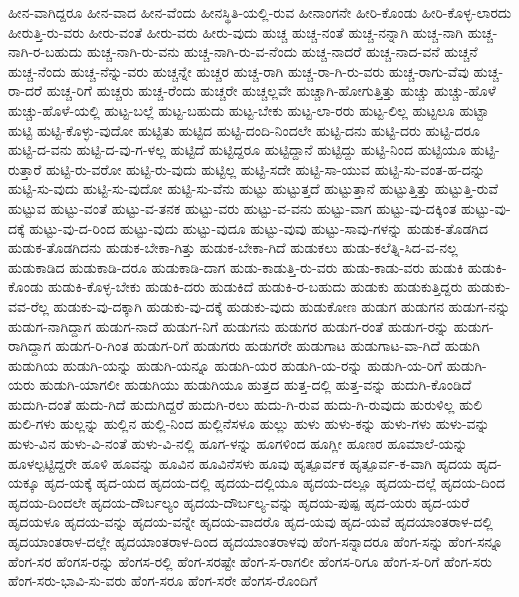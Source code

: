 {ಹೀನ-ವಾಗಿದ್ದರೂ
ಹೀನ-ವಾದ
ಹೀನ-ವೆಂದು
ಹೀನಸ್ಥಿತಿ-ಯಲ್ಲಿ-ರುವ
ಹೀನಾಂಗನೇ
ಹೀರಿ-ಕೊಂಡು
ಹೀರಿ-ಕೊಳ್ಳ-ಲಾರದು
ಹೀರುತ್ತಿ-ರು-ವರು
ಹೀರು-ವಂತೆ
ಹೀರು-ವರು
ಹೀರು-ವುದು
ಹುಚ್ಚ
ಹುಚ್ಚ-ನಂತೆ
ಹುಚ್ಚ-ನನ್ನಾಗಿ
ಹುಚ್ಚ-ನಾಗಿ
ಹುಚ್ಚ-ನಾಗಿ-ರ-ಬಹುದು
ಹುಚ್ಚ-ನಾಗಿ-ರು-ವನು
ಹುಚ್ಚ-ನಾಗಿ-ರು-ವ-ನೆಂದು
ಹುಚ್ಚ-ನಾದರೆ
ಹುಚ್ಚ-ನಾದ-ವನೆ
ಹುಚ್ಚನೆ
ಹುಚ್ಚ-ನೆಂದು
ಹುಚ್ಚ-ನೆನ್ನು-ವರು
ಹುಚ್ಚನ್ನೇ
ಹುಚ್ಚರ
ಹುಚ್ಚ-ರಾಗಿ
ಹುಚ್ಚ-ರಾ-ಗಿ-ರು-ವರು
ಹುಚ್ಚ-ರಾಗು-ವೆವು
ಹುಚ್ಚ-ರಾ-ದರೆ
ಹುಚ್ಚ-ರಿಗೆ
ಹುಚ್ಚರು
ಹುಚ್ಚ-ರೆಂದು
ಹುಚ್ಚರೇ
ಹುಚ್ಚಲ್ಲವೇ
ಹುಚ್ಚಾಗಿ-ಹೋಗುತ್ತಿತ್ತು
ಹುಚ್ಚು
ಹುಚ್ಚು-ಹೊಳೆ
ಹುಚ್ಚು-ಹೊಳೆ-ಯಲ್ಲಿ
ಹುಟ್ಟ-ಬಲ್ಲೆ
ಹುಟ್ಟ-ಬಹುದು
ಹುಟ್ಟ-ಬೇಕು
ಹುಟ್ಟ-ಲಾ-ರರು
ಹುಟ್ಟ-ಲಿಲ್ಲ
ಹುಟ್ಟಲೂ
ಹುಟ್ಟಾ
ಹುಟ್ಟಿ
ಹುಟ್ಟಿ-ಕೊಳ್ಳು-ವುದೋ
ಹುಟ್ಟಿತು
ಹುಟ್ಟಿದ
ಹುಟ್ಟಿ-ದಂದಿ-ನಿಂದಲೇ
ಹುಟ್ಟಿ-ದನು
ಹುಟ್ಟಿ-ದರು
ಹುಟ್ಟಿ-ದರೂ
ಹುಟ್ಟಿ-ದ-ವನು
ಹುಟ್ಟಿ-ದ-ವು-ಗ-ಳಲ್ಲ
ಹುಟ್ಟಿದೆ
ಹುಟ್ಟಿದ್ದರೂ
ಹುಟ್ಟಿದ್ದಾನೆ
ಹುಟ್ಟಿದ್ದು
ಹುಟ್ಟಿ-ನಿಂದ
ಹುಟ್ಟಿಯೂ
ಹುಟ್ಟಿ-ರುತ್ತಾರೆ
ಹುಟ್ಟಿ-ರು-ವರೋ
ಹುಟ್ಟಿ-ರು-ವುದು
ಹುಟ್ಟಿಲ್ಲ
ಹುಟ್ಟಿ-ಸದೇ
ಹುಟ್ಟಿ-ಸಾ-ಯುವ
ಹುಟ್ಟಿ-ಸು-ವಂತ-ಹ-ದನ್ನು
ಹುಟ್ಟಿ-ಸು-ವುದು
ಹುಟ್ಟಿ-ಸು-ವುದೋ
ಹುಟ್ಟಿ-ಸು-ವೆನು
ಹುಟ್ಟು
ಹುಟ್ಟುತ್ತದೆ
ಹುಟ್ಟುತ್ತಾನೆ
ಹುಟ್ಟುತ್ತಿತ್ತು
ಹುಟ್ಟುತ್ತಿ-ರುವೆ
ಹುಟ್ಟುವ
ಹುಟ್ಟು-ವಂತೆ
ಹುಟ್ಟು-ವ-ತನಕ
ಹುಟ್ಟು-ವರು
ಹುಟ್ಟು-ವ-ವನು
ಹುಟ್ಟು-ವಾಗ
ಹುಟ್ಟು-ವು-ದಕ್ಕಿಂತ
ಹುಟ್ಟು-ವು-ದಕ್ಕೆ
ಹುಟ್ಟು-ವು-ದ-ರಿಂದ
ಹುಟ್ಟು-ವುದು
ಹುಟ್ಟು-ವುದೂ
ಹುಟ್ಟು-ವುವು
ಹುಟ್ಟು-ಸಾವು-ಗಳನ್ನು
ಹುಡುಕ-ತೊಡಗಿದ
ಹುಡುಕ-ತೊಡಗಿದನು
ಹುಡುಕ-ಬೇಕಾ-ಗಿತ್ತು
ಹುಡುಕ-ಬೇಕಾ-ಗಿದೆ
ಹುಡುಕಲು
ಹುಡು-ಕಲೆತ್ನಿ-ಸಿದ-ವ-ನಲ್ಲ
ಹುಡುಕಾಡಿದ
ಹುಡುಕಾಡಿ-ದರೂ
ಹುಡುಕಾಡಿ-ದಾಗ
ಹುಡು-ಕಾಡುತ್ತಿ-ರು-ವರು
ಹುಡು-ಕಾಡು-ವರು
ಹುಡುಕಿ
ಹುಡುಕಿ-ಕೊಂಡು
ಹುಡುಕಿ-ಕೊಳ್ಳ-ಬೇಕು
ಹುಡುಕಿ-ದರು
ಹುಡುಕಿದೆ
ಹುಡುಕಿ-ರ-ಬಹುದು
ಹುಡುಕು
ಹುಡುಕುತ್ತಿದ್ದರು
ಹುಡುಕು-ವವ-ರೆಲ್ಲ
ಹುಡುಕು-ವು-ದಕ್ಕಾಗಿ
ಹುಡುಕು-ವು-ದಕ್ಕೆ
ಹುಡುಕು-ವುದು
ಹುಡುಕೋಣ
ಹುಡುಗ
ಹುಡುಗನ
ಹುಡುಗ-ನನ್ನು
ಹುಡುಗ-ನಾಗಿದ್ದಾಗ
ಹುಡುಗ-ನಾದೆ
ಹುಡುಗ-ನಿಗೆ
ಹುಡುಗನು
ಹುಡುಗರ
ಹುಡುಗ-ರಂತೆ
ಹುಡುಗ-ರನ್ನು
ಹುಡುಗ-ರಾಗಿದ್ದಾಗ
ಹುಡುಗ-ರಿ-ಗಿಂತ
ಹುಡುಗ-ರಿಗೆ
ಹುಡುಗರು
ಹುಡುಗರೇ
ಹುಡುಗಾಟ
ಹುಡುಗಾಟ-ವಾ-ಗಿದೆ
ಹುಡುಗಿ
ಹುಡುಗಿಯ
ಹುಡುಗಿ-ಯನ್ನು
ಹುಡುಗಿ-ಯನ್ನೂ
ಹುಡುಗಿ-ಯರ
ಹುಡುಗಿ-ಯ-ರನ್ನು
ಹುಡುಗಿ-ಯ-ರಿಗೆ
ಹುಡುಗಿ-ಯರು
ಹುಡುಗಿ-ಯಾಗಲೀ
ಹುಡುಗಿಯು
ಹುಡುಗಿಯೂ
ಹುತ್ತದ
ಹುತ್ತ-ದಲ್ಲಿ
ಹುತ್ತ-ವನ್ನು
ಹುದುಗಿ-ಕೊಂಡಿದೆ
ಹುದುಗಿ-ದಂತೆ
ಹುದು-ಗಿದೆ
ಹುದುಗಿದ್ದರೆ
ಹುದುಗಿ-ರಲು
ಹುದು-ಗಿ-ರುವ
ಹುದು-ಗಿ-ರುವುದು
ಹುರುಳಿಲ್ಲ
ಹುಲಿ
ಹುಲಿ-ಗಳು
ಹುಲ್ಲನ್ನು
ಹುಲ್ಲಿನ
ಹುಲ್ಲಿ-ನಿಂದ
ಹುಲ್ಲಿನೆಸಳೂ
ಹುಲ್ಲು
ಹುಳು
ಹುಳು-ಕನ್ನು
ಹುಳು-ಗಳು
ಹುಳು-ವನ್ನು
ಹುಳು-ವಿನ
ಹುಳು-ವಿ-ನಂತೆ
ಹುಳು-ವಿ-ನಲ್ಲಿ
ಹೂಗ-ಳನ್ನು
ಹೂಗಳಿಂದ
ಹೂಗ್ಲೀ
ಹೂಣರ
ಹೂಮಾಲೆ-ಯನ್ನು
ಹೂಳಲ್ಪಟ್ಟಿದ್ದರೇ
ಹೂಳಿ
ಹೂವನ್ನು
ಹೂವಿನ
ಹೂವಿನೆಸಳು
ಹೂವು
ಹೃತ್ಪೂರ್ವಕ
ಹೃತ್ಪೂರ್ವ-ಕ-ವಾಗಿ
ಹೃದಯ
ಹೃದ-ಯಕ್ಕೂ
ಹೃದ-ಯಕ್ಕೆ
ಹೃದ-ಯದ
ಹೃದಯ-ದಲ್ಲಿ
ಹೃದಯ-ದಲ್ಲಿಯೂ
ಹೃದಯ-ದಲ್ಲೂ
ಹೃದಯ-ದಲ್ಲೆ
ಹೃದಯ-ದಿಂದ
ಹೃದಯ-ದಿಂದಲೇ
ಹೃದಯ-ದೌರ್ಬಲ್ಯಂ
ಹೃದಯ-ದೌರ್ಬಲ್ಯ-ವನ್ನು
ಹೃದಯ-ಪುಷ್ಪ
ಹೃದ-ಯರು
ಹೃದ-ಯರೆ
ಹೃದಯಳೂ
ಹೃದಯ-ವನ್ನು
ಹೃದಯ-ವನ್ನೇ
ಹೃದಯ-ವಾದರೊ
ಹೃದ-ಯವು
ಹೃದ-ಯವೆ
ಹೃದಯಾಂತರಾಳ-ದಲ್ಲಿ
ಹೃದಯಾಂತರಾಳ-ದಲ್ಲೇ
ಹೃದಯಾಂತರಾಳ-ದಿಂದ
ಹೃದಯಾಂತರಾಳವು
ಹೆಂಗ-ಸನ್ನಾದರೂ
ಹೆಂಗ-ಸನ್ನು
ಹೆಂಗ-ಸನ್ನೂ
ಹೆಂಗ-ಸರ
ಹೆಂಗಸ-ರನ್ನು
ಹೆಂಗಸ-ರಲ್ಲಿ
ಹೆಂಗ-ಸರಷ್ಟೇ
ಹೆಂಗ-ಸ-ರಾಗಲೀ
ಹೆಂಗಸ-ರಿಗೂ
ಹೆಂಗ-ಸ-ರಿಗೆ
ಹೆಂಗ-ಸರು
ಹೆಂಗ-ಸರು-ಭಾವಿ-ಸು-ವರು
ಹೆಂಗ-ಸರೂ
ಹೆಂಗ-ಸರೇ
ಹೆಂಗಸ-ರೊಂದಿಗೆ
}
